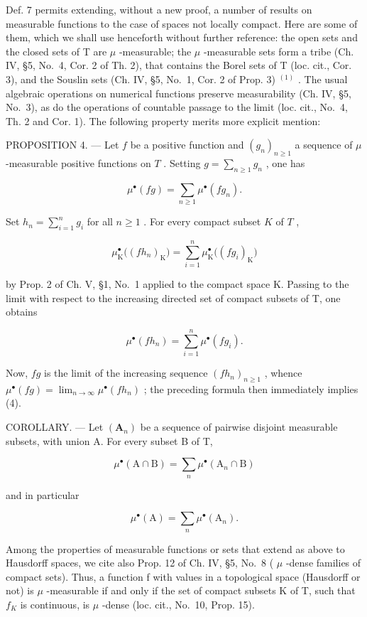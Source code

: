 Def. 7 permits extending, without a new proof, a number of results on measurable functions to the case of spaces not locally compact. Here are some of them, which we shall use henceforth without further reference: the open sets and the closed sets of T are \(\mu\) -measurable; the \(\mu\) -measurable sets form a tribe (Ch. IV, §5, No.~4, Cor. 2 of Th. 2), that contains the Borel sets of T (loc. cit., Cor. 3), and the Souslin sets (Ch. IV, §5, No.~1, Cor. 2 of Prop. 3) \(^{(1)}\) . The usual algebraic operations on numerical functions preserve measurability (Ch. IV, §5, No.~3), as do the operations of countable passage to the limit (loc. cit., No.~4, Th. 2 and Cor. 1). The following property merits more explicit mention:

PROPOSITION 4. --- Let \(f\) be a positive function and \((g_n)_{n \geqslant 1}\) a sequence of \(\mu\) -measurable positive functions on \(T\) . Setting \(g = \sum_{n \geqslant 1} g_n\) , one has

\[
\mu^ {\bullet} (f g) = \sum_ {n \geqslant 1} \mu^ {\bullet} (f g _ {n}).\tag{4}
\]

Set \(h_n = \sum_{i=1}^{n} g_i\) for all \(n \geqslant 1\) . For every compact subset \(K\) of \(T\) ,

\[
\mu_ {\mathrm{K}} ^ {\bullet} \big ((f h _ {n}) _ {\mathrm{K}} \big) = \sum_ {i = 1} ^ {n} \mu_ {\mathrm{K}} ^ {\bullet} \big ((f g _ {i}) _ {\mathrm{K}} \big)
\]

by Prop. 2 of Ch. V, §1, No.~1 applied to the compact space K. Passing to the limit with respect to the increasing directed set of compact subsets of T, one obtains

\[
\mu^ {\bullet} (f h _ {n}) = \sum_ {i = 1} ^ {n} \mu^ {\bullet} (f g _ {i}).
\]

Now, \(fg\) is the limit of the increasing sequence \((fh_n)_{n\geqslant 1}\) , whence \(\mu^{\bullet}(fg) = \lim_{n\to \infty}\mu^{\bullet}(fh_n)\) ; the preceding formula then immediately implies (4).

COROLLARY. --- Let \((\mathbf{A}_{n})\) be a sequence of pairwise disjoint measurable subsets, with union A. For every subset B of T,

\[
\mu^ {\bullet} (\mathrm{A} \cap \mathrm{B}) = \sum_ {n} \mu^ {\bullet} (\mathrm{A} _ {n} \cap \mathrm{B})
\]

and in particular

\[
\mu^ {\bullet} (\mathrm{A}) = \sum_ {n} \mu^ {\bullet} (\mathrm{A} _ {n}).
\]

Among the properties of measurable functions or sets that extend as above to Hausdorff spaces, we cite also Prop. 12 of Ch. IV, §5, No.~8 ( \(\mu\) -dense families of compact sets). Thus, a function f with values in a topological space (Hausdorff or not) is \(\mu\) -measurable if and only if the set of compact subsets K of T, such that \(f_{K}\) is continuous, is \(\mu\) -dense (loc. cit., No.~10, Prop. 15).

